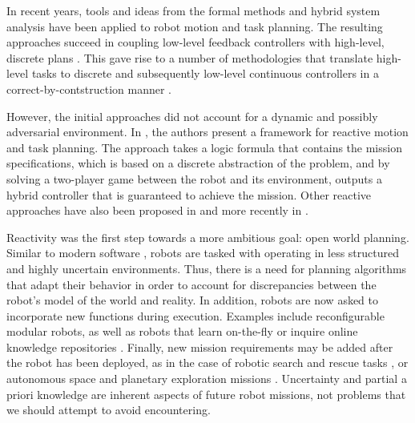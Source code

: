 In recent years, tools and ideas from the formal methods and hybrid system analysis have been applied to robot motion and task planning. The resulting approaches succeed in coupling low-level feedback controllers \cite{} with high-level, discrete plans \cite{}. This gave rise to a number of methodologies that translate high-level tasks to discrete and subsequently low-level continuous controllers in a correct-by-contstruction manner \cite{}.

However, the initial approaches did not account for a dynamic and possibly adversarial environment. In \cite{KGFP_TRO09}, the authors present a framework for reactive motion and task planning. The approach takes a logic formula that contains the mission specifications, which is based on a discrete abstraction of the problem, and by solving a two-player game between the robot and its environment, outputs a hybrid controller that is guaranteed to achieve the mission. Other reactive approaches have also been proposed in \cite{Wongpiromsarn2010} and more recently in \cite{Belta2013RSS}.

Reactivity was the first step towards a more ambitious goal: open world planning. Similar to modern software \cite{open-world-sw}, robots are tasked with operating in less structured and highly uncertain environments. Thus, there is a need for planning algorithms that adapt their behavior in order to account for discrepancies between the robot's model of the world and reality. In addition, robots are now asked to incorporate new functions during execution. Examples include reconfigurable modular robots, as well as robots that learn on-the-fly \cite{SaxenaIJRR2012} or inquire online knowledge repositories \cite{rapyuta2013}. Finally, new mission requirements may be added after the robot has been deployed, as in the case of robotic search and rescue tasks \cite{MatthiasAI2010}, or autonomous space and planetary exploration missions \cite{spaceXplore2006}. Uncertainty and partial a priori knowledge are inherent aspects of future robot missions, not problems that we should attempt to avoid encountering.

